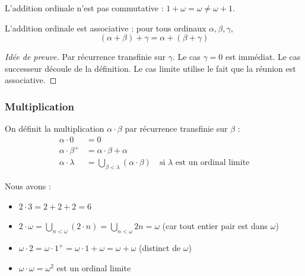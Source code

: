 \begin{remarque}
	L'addition ordinale n'est pas commutative : $1 + \omega = \omega \neq \omega + 1$.
\end{remarque}

\begin{proposition}\label{prop:addition_associative}
	L'addition ordinale est associative : pour tous ordinaux $\alpha, \beta, \gamma$,
	$$(\alpha + \beta) + \gamma = \alpha + (\beta + \gamma)$$
\end{proposition}

\begin{proof}[Idée de preuve]
	Par récurrence transfinie sur $\gamma$. Le cas $\gamma = 0$ est immédiat. Le cas successeur découle de la définition. Le cas limite utilise le fait que la réunion est associative.
\end{proof}

\subsubsection{Multiplication}

\begin{definition}
	On définit la multiplication $\alpha \cdot \beta$ par récurrence transfinie sur $\beta$ :
	\begin{align*}
		\alpha \cdot 0       & = 0                                                                                              \\
		\alpha \cdot \beta^+ & = \alpha \cdot \beta + \alpha                                                                    \\
		\alpha \cdot \lambda & = \bigcup_{\beta < \lambda} (\alpha \cdot \beta) \quad \text{si $\lambda$ est un ordinal limite}
	\end{align*}
\end{definition}

\begin{exemple}
Nous avons :
	\begin{itemize}
		\item $2 \cdot 3 = 2 + 2 + 2 = 6$
		\item $2 \cdot \omega = \bigcup_{n < \omega} (2 \cdot n) = \bigcup_{n < \omega} 2n = \omega$ (car tout entier pair est dans $\omega$)
		\item $\omega \cdot 2 = \omega \cdot 1^+ = \omega \cdot 1 + \omega = \omega + \omega$ (distinct de $\omega$)
		\item $\omega \cdot \omega = \omega^2$ est un ordinal limite
	\end{itemize}
\end{exemple}

